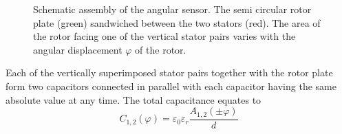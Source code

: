         \begin{figure}[h]
            \centering
            \caption[Schematic assembly of the angular sensor]{Schematic assembly of the angular sensor. The semi circular rotor plate (green) sandwiched between the two stators (red). The area of the rotor facing one of the vertical stator
            pairs varies with the angular displacement \( \varphi \)
            of the rotor.}
            \label{fig:rotorPositions}
        \end{figure}
        Each of the vertically superimposed stator pairs together with the rotor plate form two capacitors connected in parallel
        with each capacitor having the same absolute value at any time. The total capacitance equates to
        \begin{equation}
            C_{1,2}(\varphi) = \varepsilon_0 \varepsilon_r \frac{A_{1,2}(\pm \varphi)}{d}
            \label{eq:angularCapacitance}
        \end{equation}
